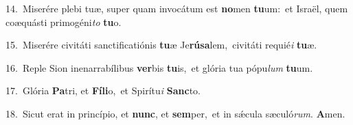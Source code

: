 {\numbfont\textcolor{\numbcolor}{14.}}~Miserére plebi tuæ, super quam invocátum est \textbf{no}\-men \textbf{tu}\-um:~\star et Israël, quem coæquásti primogéni\textit{to} \textbf{tu}\-o.\par
{\numbfont\textcolor{\numbcolor}{15.}}~Miserére civitáti sanctificatiónis \textbf{tu}\-æ Je\-\textbf{rú}\-\textbf{sa}lem,~\star civitáti requié\textit{i} \textbf{tu}\-æ.\par
{\numbfont\textcolor{\numbcolor}{16.}}~Reple Sion inenarrabílibus \textbf{ver}\-bis \textbf{tu}\-is,~\star et glória tua pópu\textit{lum} \textbf{tu}\-um.\par
{\numbfont\textcolor{\numbcolor}{17.}}~Glória \textbf{Pa}\-tri, et \textbf{Fí}\-\textbf{li}o,~\star et Spirítu\textit{i} \textbf{Sanc}\-to.\par
{\numbfont\textcolor{\numbcolor}{18.}}~Sicut erat in princípio, et \textbf{nunc}\-, et \textbf{sem}\-per,~\star et in sǽcula sæculó\-\textit{rum}\-. \textbf{A}\-men.\par
